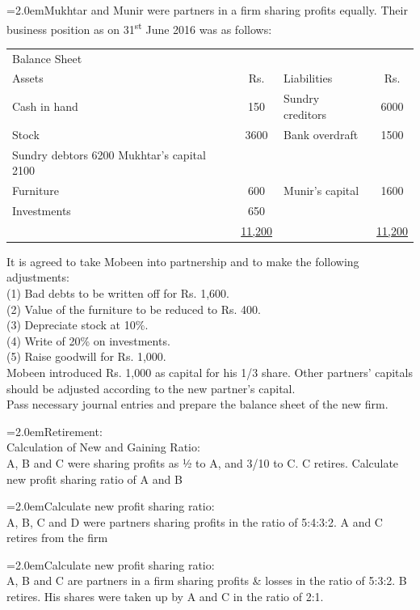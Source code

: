 \documentclass[11pt,a4paper]{article}
\newcommand{\lqn}[2]{\Needspace{6\baselineskip}\par\medskip\noindent\hangindent=2.0em\hangafter=1\makebox[2.0em][l]{\textbf{#1.}}#2\par}
\begin{document}
\lqn{95}{Mukhtar and Munir were partners in a firm sharing profits equally. Their business position as on 31\textsuperscript{st}  June 2016 was as follows:\par
\par\smallskip\noindent\hspace*{1.2em}\begin{tabular}{|lclc|}
\hline
Balance Sheet &  &  &  \\
Assets & Rs. & Liabilities & Rs. \\
Cash in hand & 150 & Sundry creditors & 6000 \\
Stock & 3600 & Bank overdraft & 1500 \\
Sundry debtors 6200 Mukhtar’s capital 2100 &  &  &  \\
Furniture & 600 & Munir’s capital & 1600 \\
Investments & 650 &  &  \\
 & \underline{11,200} &  & \underline{11,200} \\
\hline
\end{tabular}\par\smallskip
It is agreed to take Mobeen into partnership and to make the following adjustments:\\
(1) Bad debts to be written off for Rs. 1,600.\\
(2) Value of the furniture to be reduced to Rs. 400.\\
(3) Depreciate stock at 10\%.\\
(4) Write of 20\% on investments.\\
(5) Raise goodwill for Rs. 1,000.\\
Mobeen introduced Rs. 1,000 as capital for his 1/3 share. Other partners’ capitals should be adjusted according to the new partner’s capital.\\
Pass necessary journal entries and prepare the balance sheet of the new firm.\par
}
\lqn{96}{Retirement:\\
Calculation of New and Gaining Ratio:\\
A, B and C were sharing profits as ½ to A, and 3/10 to C. C retires. Calculate new profit sharing ratio of A and B\par
}
\lqn{97}{Calculate new profit sharing ratio:\\
A, B, C and D were partners sharing profits in the ratio of 5:4:3:2. A and C retires from the firm\par
}
\lqn{98}{Calculate new profit sharing ratio:\\
A, B and C are partners in a firm sharing profits \& losses in the ratio of 5:3:2. B retires. His shares were taken up by A and C in the ratio of 2:1.\par
}
\end{document}

